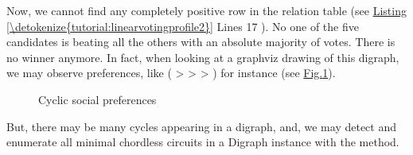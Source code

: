 \documentclass[a4paper,12pt,english]{sphinxhowto}
\let\sphinxpxdimen\pdfpxdimen\else\newdimen\sphinxpxdimen
\begin{document}
\begin{sphinxVerbatim}[commandchars=\\\{\},numbers=left,firstnumber=1,stepnumber=1]
\end{sphinxVerbatim}

Now, we cannot find any completely positive row in the relation table (see \hyperref[\detokenize{tutorial:linearvotingprofile2}]{Listing \ref{\detokenize{tutorial:linearvotingprofile2}}} Lines 17 \sphinxhyphen{} ). No one of the five candidates is beating all the others with an absolute majority of votes. There is no  winner anymore. In fact, when looking at a graphviz drawing of this  digraph, we may observe  preferences, like ( \textgreater{}  \textgreater{}  \textgreater{} ) for instance (see \hyperref[\detokenize{tutorial:cyclicsocialpreferences}]{Fig.\@ \ref{\detokenize{tutorial:cyclicsocialpreferences}}}).

\begin{sphinxVerbatim}[commandchars=\\\{\},numbers=left,firstnumber=1,stepnumber=1]
\end{sphinxVerbatim}

\begin{figure}[H]
\centering
\capstart

\noindent\sphinxincludegraphics[width=200\sphinxpxdimen]{{cycles}.png}
\caption{Cyclic social preferences}\label{\detokenize{tutorial:cyclicsocialpreferences}}\end{figure}

But, there may be many cycles appearing in a  digraph, and, we may detect and enumerate all minimal chordless circuits in a Digraph instance with the  method.
\end{document}
